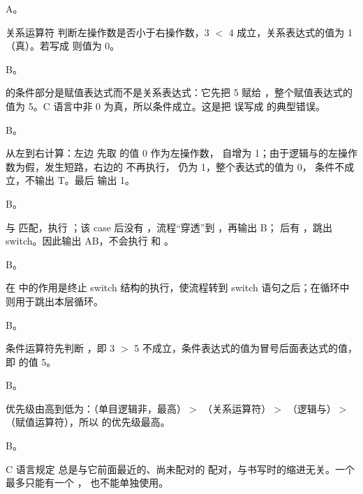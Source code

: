 \documentclass[a4paper,11pt]{article}
\begin{document}


\q A。\begin{analysis}关系运算符 \code{<} 判断左操作数是否小于右操作数，3 $<$ 4 成立，关系表达式的值为 1（真）。若写成  则值为 0。\end{analysis}

\q B。\begin{analysis} 的条件部分是赋值表达式而不是关系表达式：它先把 5 赋给 ，整个赋值表达式的值为 5。C 语言中非 0 为真，所以条件成立。这是把 \code{=} 误写成 \code{==} 的典型错误。\end{analysis}

\q B。\begin{analysis} 从左到右计算：左边  先取  的值 0 作为左操作数， 自增为 1；由于逻辑与的左操作数为假，发生短路，右边的  不再执行， 仍为 1，整个表达式的值为 0， 条件不成立，不输出 T。最后  输出 1。\end{analysis}

\q B。\begin{analysis} 与  匹配，执行 ；该 case 后没有 ，流程“穿透”到 ，再输出 B； 后有 ，跳出 switch。因此输出 AB，不会执行  和 。\end{analysis}

\q B。\begin{analysis} 在  中的作用是终止 switch 结构的执行，使流程转到 switch 语句之后；在循环中  则用于跳出本层循环。\end{analysis}

\q B。\begin{analysis}条件运算符先判断 ，即 3 $>$ 5 不成立，条件表达式的值为冒号后面表达式的值，即  的值 5。\end{analysis}

\q B。\begin{analysis}优先级由高到低为：\code{!}（单目逻辑非，最高）$>$ \code{>}（关系运算符）$>$ \code{\&\&}（逻辑与）$>$ \code{=}（赋值运算符），所以 \code{!} 的优先级最高。\end{analysis}

\q B。\begin{analysis}C 语言规定  总是与它前面最近的、尚未配对的  配对，与书写时的缩进无关。一个  最多只能有一个 ， 也不能单独使用。\end{analysis}
\end{document}
